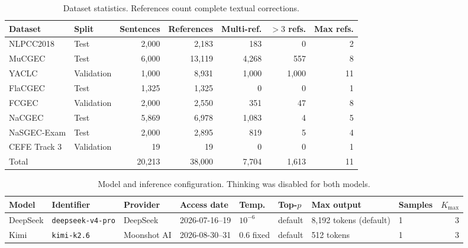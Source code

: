 \begin{table}[t]
\centering
\small
\begin{tabular}{llrrrrr}
\toprule
Dataset & Split & Sentences & References & Multi-ref. & $>3$ refs. & Max refs. \\
\midrule
NLPCC2018 & Test & 2,000 & 2,183 & 183 & 0 & 2 \\
MuCGEC & Test & 6,000 & 13,119 & 4,268 & 557 & 8 \\
YACLC & Validation & 1,000 & 8,931 & 1,000 & 1,000 & 11 \\
FlaCGEC & Test & 1,325 & 1,325 & 0 & 0 & 1 \\
FCGEC & Validation & 2,000 & 2,550 & 351 & 47 & 8 \\
NaCGEC & Test & 5,869 & 6,978 & 1,083 & 4 & 5 \\
NaSGEC-Exam & Test & 2,000 & 2,895 & 819 & 5 & 4 \\
CEFE Track 3 & Validation & 19 & 19 & 0 & 0 & 1 \\
\midrule
Total & & 20,213 & 38,000 & 7,704 & 1,613 & 11 \\
\bottomrule
\end{tabular}
\caption{Dataset statistics. References count complete textual corrections.}
\label{tab:dataset_statistics}
\end{table}

\begin{table}[t]
\centering
\small
\begin{tabular}{llllllllr}
\toprule
Model & Identifier & Provider & Access date & Temp. & Top-$p$ & Max output & Samples & $K_{\max}$ \\
\midrule
DeepSeek & \texttt{deepseek-v4-pro} & DeepSeek & 2026-07-16--19 & $10^{-6}$ & default & 8,192 tokens (default) & 1 & 3 \\
Kimi & \texttt{kimi-k2.6} & Moonshot AI & 2026-08-30--31 & 0.6 fixed & default & 512 tokens & 1 & 3 \\
\bottomrule
\end{tabular}
\caption{Model and inference configuration. Thinking was disabled for both models.}
\label{tab:model_configuration}
\end{table}
